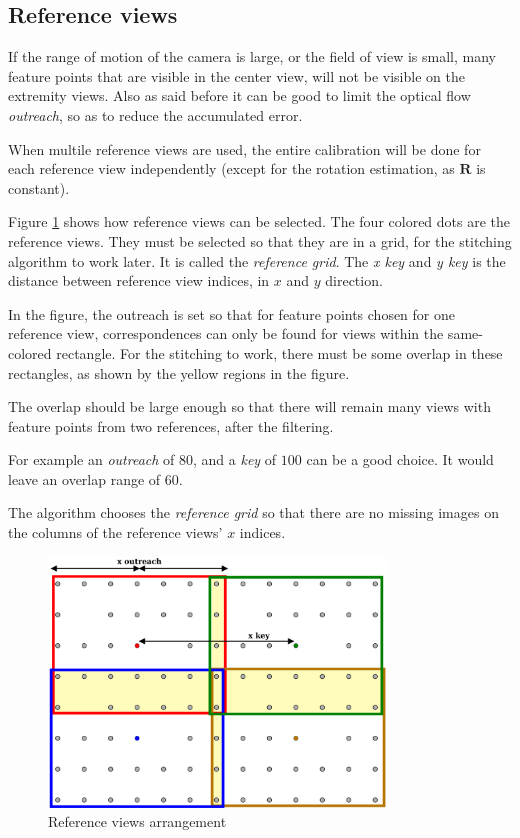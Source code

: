 \documentclass{scrreprt}
\newcommand{\matr}[1]{\mathbf{#1}}
\begin{document}
\subsection{Reference views}
\label{sec:refviews}
If the range of motion of the camera is large, or the field of view is small, many feature points that are visible in the center view, will not be visible on the extremity views. Also as said before it can be good to limit the optical flow \emph{outreach}, so as to reduce the accumulated error.

When multile reference views are used, the entire calibration will be done for each reference view independently (except for the rotation estimation, as $\matr{R}$ is constant).

Figure \ref{fig:refview} shows how reference views can be selected. The four colored dots are the reference views. They must be selected so that they are in a grid, for the stitching algorithm to work later. It is called the \emph{reference grid}. The \emph{x key} and \emph{y key} is the distance between reference view indices, in $x$ and $y$ direction.

In the figure, the outreach is set so that for feature points chosen for one reference view, correspondences can only be found for views within the same-colored rectangle. For the stitching to work, there must be some overlap in these rectangles, as shown by the yellow regions in the figure. 

The overlap should be large enough so that there will remain many views with feature points from two references, after the filtering.

For example an \emph{outreach} of $80$, and a \emph{key} of $100$ can be a good choice. It would leave an overlap range of $60$.

The algorithm chooses the \emph{reference grid} so that there are no missing images on the columns of the reference views' $x$ indices.

\begin{figure}
\centering
\includegraphics[width=0.8\textwidth]{refview.pdf}
\caption{Reference views arrangement}
\label{fig:refview}
\end{figure}
\end{document}
